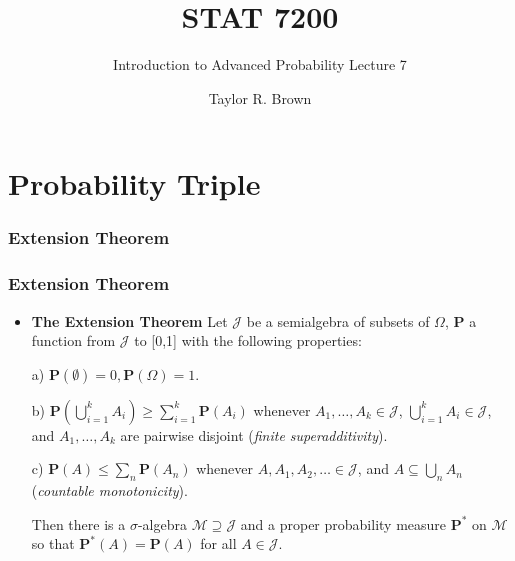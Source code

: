 \documentclass[handout]{beamer}
\title{STAT 7200}
\subtitle{Introduction to Advanced Probability \newline Lecture 7}
\author{Taylor R. Brown}
\institute{}
\date{}
\newcommand{\BP}{\mathbf{P}}
\begin{document}
\frame{\titlepage}

\section[Outline]{}


\section{Probability Triple}

\subsubsection{Extension Theorem}
\frame
{
  \frametitle{Extension Theorem}

   \begin{itemize}

             \item<1-> [] \begin{Theorem} \textbf{The Extension Theorem}  Let $\mathcal{J}$ be a semialgebra of subsets of $\Omega$,  $\mathbf{P}$ a function from $\mathcal{J}$  to [0,1] with the following properties:
             \newline
             
             a) $\mathbf{P} (\emptyset)=0, \mathbf{P}(\Omega)=1$.
                 \newline
         
             b) $\BP(\bigcup_{i=1}^k A_i)\geq \sum_{i=1}^k \BP(A_i)$ whenever $A_1,\ldots,A_k \in\mathcal{J}$, $\bigcup_{i=1}^k A_i  \in\mathcal{J}$, and $A_1,\ldots,A_k$ are pairwise disjoint (\textit{finite superadditivity}).
                   \newline
       
             c) $\BP(A)\leq \sum_{n} \BP(A_n)$ whenever $A,A_1,A_2,\ldots \in\mathcal{J}$, and $A\subseteq \bigcup_{n} A_n$ (\textit{countable monotonicity}).               
             \newline
             
             Then there is a $\sigma$-algebra $\mathcal{M} \supseteq \mathcal{J}$ and a proper probability measure $\BP^*$ on $\mathcal{M}$ so that $\BP^*(A)=\BP(A)$ for all $A\in \mathcal{J}$.
             \end{Theorem}    
       
                
                 \end{itemize}
}
\end{document}
